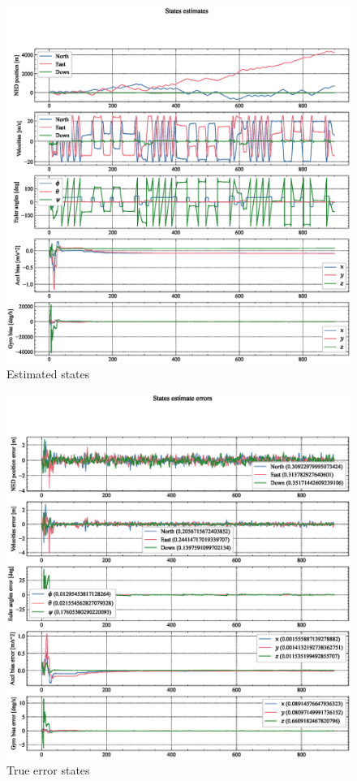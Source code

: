 \begin{figure}
    \centering
    \includegraphics[clip, trim= 0cm 0cm 0cm 0cm, width = \textwidth]{figures/sim_2.eps}
    \caption{Estimated states}
    \label{fig:1_2}
\end{figure}
\begin{figure}
    \centering
    \includegraphics[clip, trim= 0cm 0cm 0cm 0cm, width = \textwidth]{figures/sim_3.eps}
    \caption{True error states}
    \label{fig:23states}
\end{figure}
